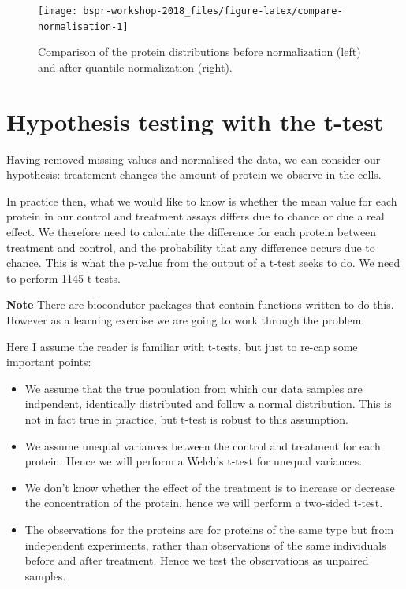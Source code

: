 \documentclass[12pt,]{book}
\theoremstyle{definition}
\theoremstyle{definition}
\theoremstyle{definition}
\theoremstyle{remark}
\begin{document}
\begin{figure}

{\centering \texttt{[image: bspr-workshop-2018\_files/figure-latex/compare-normalisation-1]} 

}

\caption{Comparison of the protein distributions before
normalization (left) and after quantile normalization (right).}\label{fig:compare-normalisation}
\end{figure}

\section{Hypothesis testing with the
t-test}\label{hypothesis-testing-with-the-t-test}

Having removed missing values and normalised the data, we can consider
our hypothesis: treatement changes the amount of protein we observe in
the cells.

In practice then, what we would like to know is whether the mean value
for each protein in our control and treatment assays differs due to
chance or due a real effect. We therefore need to calculate the
difference for each protein between treatment and control, and the
probability that any difference occurs due to chance. This is what the
p-value from the output of a t-test seeks to do. We need to perform 1145
t-tests.

\textbf{Note} There are biocondutor packages that contain functions
written to do this. However as a learning exercise we are going to work
through the problem.

Here I assume the reader is familiar with t-tests, but just to re-cap
some important points:

\begin{itemize}
\item
  We assume that the true population from which our data samples are
  indpendent, identically distributed and follow a normal distribution.
  This is not in fact true in practice, but t-test is robust to this
  assumption.
\item
  We assume unequal variances between the control and treatment for each
  protein. Hence we will perform a Welch's t-test for unequal variances.
\item
  We don't know whether the effect of the treatment is to increase or
  decrease the concentration of the protein, hence we will perform a
  two-sided t-test.
\item
  The observations for the proteins are for proteins of the same type
  but from independent experiments, rather than observations of the same
  individuals before and after treatment. Hence we test the observations
  as unpaired samples.
\end{itemize}
\end{document}
